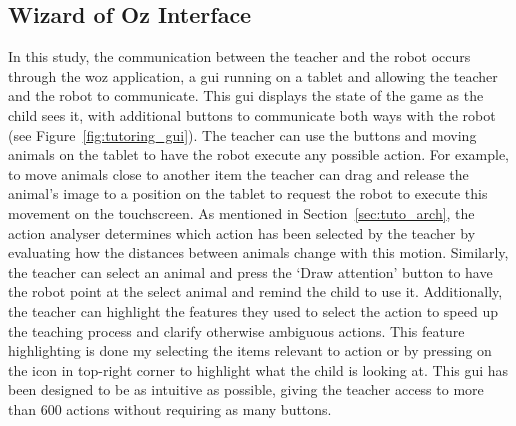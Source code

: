 \subsection{Wizard of Oz Interface} \label{sec:tuto_woz}

In this study, the communication between the teacher and the robot occurs through the \gls{woz} application, a \gls{gui} running on a tablet and allowing the teacher and the robot to communicate. This \gls{gui} displays the state of the game as the child sees it, with additional buttons to communicate both ways with the robot (see Figure~\ref{fig:tutoring_gui}). The teacher can use the buttons and moving animals on the tablet to have the robot execute any possible action. For example, to move animals close to another item the teacher can drag and release the animal's image to a position on the tablet to request the robot to execute this movement on the touchscreen. As mentioned in Section~\ref{sec:tuto_arch}, the action analyser determines which action has been selected by the teacher by evaluating how the distances between animals change with this motion. Similarly, the teacher can select an animal and press the `Draw attention' button to have the robot point at the select animal and remind the child to use it.
Additionally, the teacher can highlight the features they used to select the action to speed up the teaching process and clarify otherwise ambiguous actions. This feature highlighting is done my selecting the items relevant to action or by pressing on the icon in top-right corner to highlight what the child is looking at.
This \gls{gui} has been designed to be as intuitive as possible, giving the teacher access to more than 600 actions without requiring as many buttons. %

